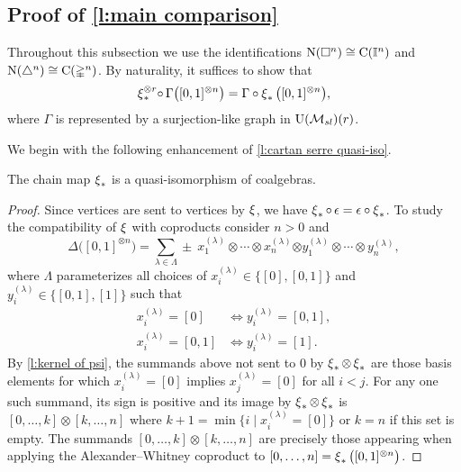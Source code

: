 \subsection{Proof of \cref{l:main comparison}} \label{ss:comparison proof}

Throughout this subsection we use the identifications $\operatorname{N}(\square^n) \cong \operatorname{C}(\mathbb{I}^n)$ and $\operatorname{N}(\triangle^n) \cong \operatorname{C}(\mathbb{\Delta}^n)$.
By naturality, it suffices to show that
\begin{equation} \label{e:Cartan--Serre E-coalgebra map}
\operatorname{\xi}_\ast^{\otimes r} \! \circ \, \Gamma \big( [0,1]^{\otimes n} \big) =
\Gamma \circ \operatorname{\xi}_\ast \big( [0,1]^{\otimes n} \big),
\end{equation}
where $\Gamma$ is represented by a surjection-like graph in ${\operatorname{U}(\mathcal{M}_{sl})}(r)$.

We begin with the following enhancement of \cref{l:cartan serre quasi-iso}.

\begin{lemma}
	The chain map $\operatorname{\xi}_\ast$ is a quasi-isomorphism of coalgebras.
\end{lemma}

\begin{proof}
	Since vertices are sent to vertices by $\operatorname{\xi}$, we have $\operatorname{\xi}_\ast \circ \, \epsilon = \epsilon \circ \operatorname{\xi}_\ast$.
	To study the compatibility of $\operatorname{\xi}$ with coproducts consider $n > 0$ and
	\[
	\Delta \big( [0,1]^{\otimes n} \big) = \sum_{\lambda \in \Lambda} \pm \ x_1^{(\lambda)} \otimes \cdots \otimes x_n^{(\lambda)} \bm{\otimes} y_1^{(\lambda)} \otimes \cdots \otimes y_n^{(\lambda)},
	\]
	where $\Lambda$ parameterizes all choices of $x_i^{(\lambda)} \in \{[0], [0,1]\}$ and $y_i^{(\lambda)} \in \{[0,1], [1]\}$ such that
	\begin{align*}
	x_i^{(\lambda)} = [0]   & \iff y_i^{(\lambda)} = [0,1], \\
	x_i^{(\lambda)} = [0,1] & \iff y_i^{(\lambda)} = [1].
	\end{align*}
	By \cref{l:kernel of psi}, the summands above not sent to $0$ by $\operatorname{\xi}_\ast \otimes \operatorname{\xi}_\ast$ are those basis elements for which $x_i^{(\lambda)} = [0]$ implies $x_j^{(\lambda)} = [0]$ for all $i < j$.
	For any one such summand, its sign is positive and its image by $\operatorname{\xi}_\ast \otimes \operatorname{\xi}_\ast$ is $[0, \dots, k] \otimes [k, \dots, n]$ where $k+1 = \min \{i \mid x_i^{(\lambda)} = [0]\}$ or $k = n$ if this set is empty.
	The summands $[0, \dots, k] \otimes [k, \dots, n]$ are precisely those appearing when applying the Alexander--Whitney coproduct to $[0, \dots, n] = \operatorname{\xi}_\ast \big( [0,1]^{\otimes n} \big)$.
\end{proof}

